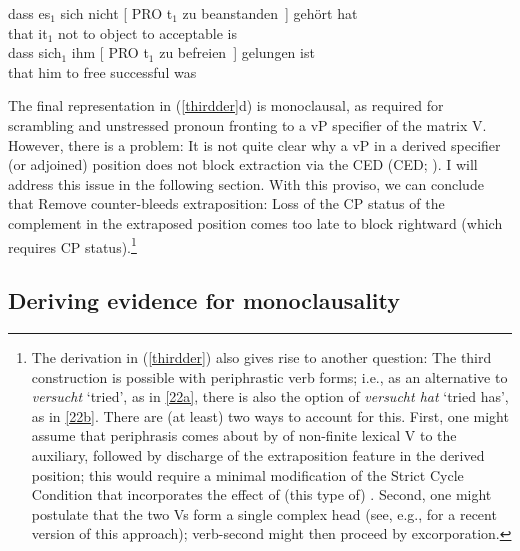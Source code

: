 \documentclass[output=paper]{langsci/langscibook}
\begin{document}
\ea\label{ex:end} 
    \ea
        \gll dass es$_1$ sich nicht [ PRO t$_1$ zu beanstanden~] {gehört hat}\\
            that it$_1$ \Refl{} not {} {} {}  to {object to} {acceptable is}\\
    \ex
        \gll dass sich$_1$ ihm [ PRO t$_1$ zu befreien~] {gelungen ist}\\
            that \Refl{} him\textsubscript{\Dat}  {} {} {} to free {successful was}\\
    \z
\z

The final representation in (\ref{thirdder}d) is monoclausal, as required for
scrambling and unstressed pronoun fronting to a vP specifier of the matrix V.
However, there is a problem: It is not quite clear why a vP in a derived
specifier (or adjoined) position does not block extraction via the
\glsdesc{CED} (\gls{CED};
\citealt{Huang:82,Chomsky:86,Cinque:90}).  I will address this issue in the
following section. With this proviso, we can conclude that Remove
counter-bleeds extraposition: Loss of the CP status of the complement in the
extraposed position comes too late to block rightward  (which requires
CP status).\footnote{The derivation in (\ref{thirdder}) also gives rise to
    another question: The third construction is possible with periphrastic verb
    forms; i.e., as an alternative to {\it versucht} \enquote*{tried}, as in
    \eqref{22a}, there is also the option of {\it versucht hat} \enquote*{tried
    has}, as in \eqref{22b}. There are (at least) two ways to account for this.
    First, one might assume that periphrasis comes about by  of
    non-finite lexical V to the auxiliary, followed by discharge of the
    extraposition feature in the derived position; this would require a minimal
    modification of the Strict Cycle Condition that incorporates the effect of
(this type of) . Second, one might postulate that the two Vs form
a single complex head (see, e.g., \citealt{Zwart:16} for a recent version of
this approach); verb-second  might then proceed  by excorporation.}

\subsection{Deriving evidence for monoclausality}
\end{document}

